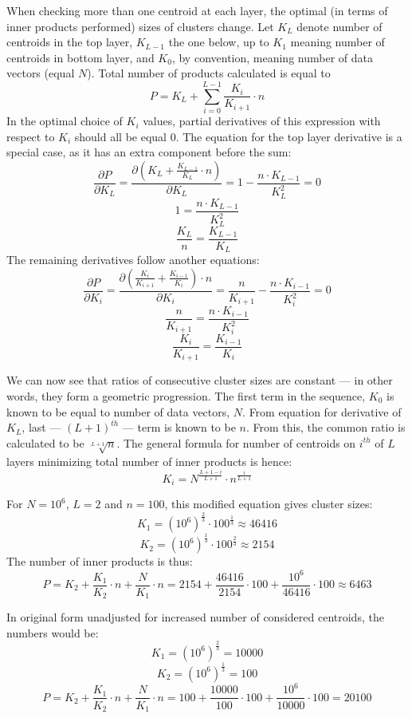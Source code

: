 When checking more than one centroid at each layer, the optimal (in terms
of inner products performed) sizes of clusters change. Let $ K_L $ denote
number of centroids in the top layer, $ K_{L-1} $ the one below, up to
$ K_1 $ meaning number of centroids in bottom layer, and $ K_0 $, by 
convention, meaning number of data vectors (equal $N$). Total number of
products calculated is equal to 
$$ P = K_L + \sum_{i=0}^{L-1} \frac{K_i}{K_{i+1}} \cdot n $$
In the optimal choice of $K_i$ values, partial derivatives of this expression
with respect to $K_i$ should all be equal 0. The equation for the top layer 
derivative is a special case, as it has an extra component before the sum:
$$ 
\frac{\partial P}{\partial K_L} = 
\frac{\partial (K_L + \frac{K_{L-1}}{K_L} \cdot n)}{\partial K_L} =
1 -\frac{n \cdot K_{L-1}}{K_L^2} = 
0
$$
$$
1 = \frac{n \cdot K_{L-1}}{K_L^2}
$$
$$
\frac{K_L}{n} = \frac{K_{L-1}}{K_L}
$$
The remaining derivatives follow another equations:
$$
\frac{\partial P}{\partial K_i} =
\frac{\partial (\frac{K_i}{K_{i+1}} + \frac{K_{i-1}}{K_i}) \cdot n}{\partial K_i} =
\frac{n}{K_{i+1}} - \frac{n \cdot K_{i-1}}{K_i^2} = 0
$$
$$
\frac{n}{K_{i+1}} = \frac{n \cdot K_{i-1}}{K_i^2}
$$
$$
\frac{K_i}{K_{i+1}} = \frac{K_{i-1}}{K_i}
$$

We can now see that ratios of consecutive cluster sizes are constant --- in other
words, they form a geometric progression. The first term in the sequence,
$K_0$ is known to be equal to number of data vectors, $N$. From equation
for derivative of $K_L$, last --- $(L+1)^{th}$ --- term is known to be $n$. From this,
the common ratio is calculated to be $\sqrt[L+1]{n}$. The general formula
for number of centroids on $i^{th}$ of $L$ layers minimizing total number of
inner products is hence:
$$
K_i = N^{\frac{L+1-i}{L+1}} \cdot n^\frac{i}{L+1}
$$

For $N = 10^6$, $L = 2$ and $n = 100$, this modified equation gives cluster sizes:
$$ K_1 = (10^6)^{\frac{2}{3}} \cdot 100^\frac{1}{3} \approx 46416 $$
$$ K_2 = (10^6)^{\frac{1}{3}} \cdot 100^\frac{2}{3} \approx 2154 $$
The number of inner products is thus:
$$ 
P = K_2 + \frac{K_1}{K_2} \cdot n + \frac{N}{K_1} \cdot n =
2154 + \frac{46416}{2154} \cdot 100 + \frac{10^6}{46416} \cdot 100 \approx
6463
$$

In original form unadjusted for increased number of considered centroids,
the numbers would be:
$$ K_1 = (10^6)^{\frac{2}{3}} = 10000 $$
$$ K_2 = (10^6)^{\frac{1}{3}} = 100 $$
$$ 
P = K_2 + \frac{K_1}{K_2} \cdot n + \frac{N}{K_1} \cdot n =
100 + \frac{10000}{100} \cdot 100 + \frac{10^6}{10000} \cdot 100 =
20100
$$

